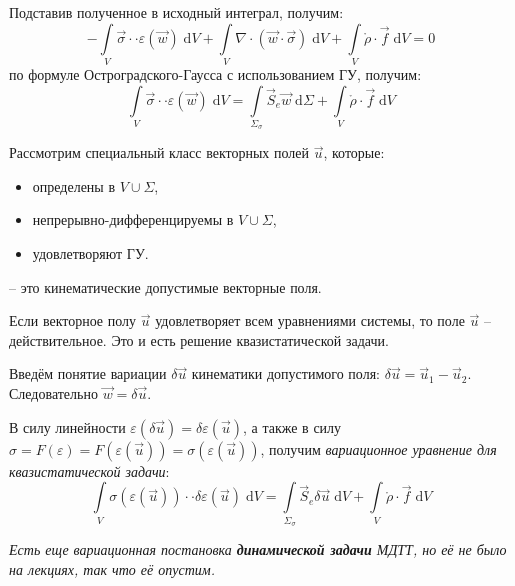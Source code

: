 Подставив полученное в исходный интеграл, получим:
\[
	- \int\limits_V \vec{\sigma}\cdot\cdot\varepsilon(\vec{w}) \;\mathrm{d}V
	+ \int\limits_V \nabla\cdot\left(\vec{w}\cdot\vec{\sigma}\right) \;\mathrm{d}V
	+ \int\limits_V \mathring{\rho}\cdot\vec{f} \;\mathrm{d}V
	=0
\]
по формуле Остроградского-Гаусса с использованием ГУ, получим:
\[
	\int\limits_V \vec{\sigma}\cdot\cdot\varepsilon(\vec{w}) \;\mathrm{d}V =
	\int\limits_{\Sigma_\sigma} \vec{S}_e\vec{w} \;\mathrm{d}\Sigma
	+ \int\limits_V \mathring{\rho}\cdot\vec{f}\;\mathrm{d}V
\]

Рассмотрим специальный класс векторных полей $\vec{u}$, которые:
\begin{itemize}
	\item определены в $V\cup\Sigma$,
	\item непрерывно-дифференцируемы в $V\cup\Sigma$,
	\item удовлетворяют ГУ.
\end{itemize}
-- это кинематические допустимые векторные поля.

Если векторное полу $\vec{u}$ удовлетворяет всем уравнениями системы, то поле $\vec{u}$ -- действительное. Это и есть решение квазистатической задачи.

Введём понятие вариации $\delta\vec{u}$ кинематики допустимого поля: $\delta\vec{u}=\vec{u}_1-\vec{u}_2$. Следовательно $\vec{w}=\delta\vec{u}$.

В силу линейности $\varepsilon(\delta\vec{u})=\delta\varepsilon(\vec{u})$, а также в силу $\sigma=F(\varepsilon)=F(\varepsilon(\vec{u})) = \sigma(\varepsilon(\vec{u}))$, получим \textit{вариационное уравнение для квазистатической задачи}:
\[
	\int\limits_V \sigma(\varepsilon(\vec{u}))\cdot\cdot\delta\varepsilon(\vec{u})\;\mathrm{d}V =
	\int\limits_{\Sigma_\sigma} \vec{S}_e\delta\vec{u}\;\mathrm{d}V +
	\int\limits_V \mathring{\rho}\cdot\vec{f}\;\mathrm{d}V
\]

\begin{remark}
	\textit{Есть еще вариационная постановка \textbf{динамической задачи} МДТТ, но её не было на лекциях, так что её опустим.}
\end{remark}
